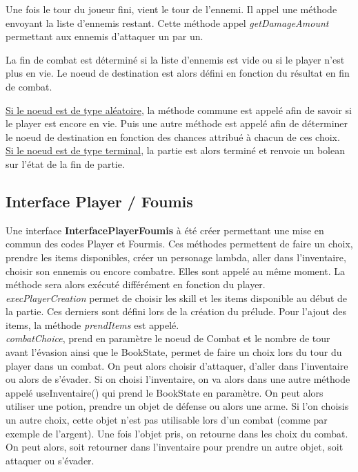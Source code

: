 		Une fois le tour du joueur fini, vient le tour de l'ennemi. Il appel une méthode envoyant la liste d'ennemis restant. Cette méthode appel \textit{getDamageAmount} permettant aux ennemis d'attaquer un par un.

		La fin de combat est déterminé si la liste d'ennemis est vide ou si le player n'est plus en vie. Le noeud de destination est alors défini en fonction du résultat en fin de combat.

		\underline{Si le noeud est de type aléatoire}, la méthode commune est appelé afin de savoir si le player est encore en vie. Puis une autre méthode est appelé afin de déterminer le noeud de destination en fonction des chances attribué à chacun de ces choix.\\

		\underline{Si le noeud est de type terminal}, la partie est alors terminé et renvoie un bolean sur l'état de la fin de partie.\\

	\subsection{Interface Player / Foumis}
		Une interface \textbf{InterfacePlayerFoumis} à été créer permettant une mise en commun des codes Player et Fourmis. Ces méthodes permettent de faire un choix, prendre les items disponibles, créer un personage lambda, aller dans l'inventaire, choisir son ennemis ou encore combatre. Elles sont appelé au même moment. La méthode sera alors exécuté différément en fonction du player.\\

		\textit{execPlayerCreation} permet de choisir les skill et les items disponible au début de la partie. Ces derniers sont défini lors de la création du prélude. Pour l'ajout des items, la méthode \textit{prendItems} est appelé.\\

		\textit{combatChoice}, prend en paramètre le noeud de Combat et le nombre de tour avant l'évasion ainsi que le BookState, permet de faire un choix lors du tour du player dans un combat. On peut alors choisir d'attaquer, d'aller dans l'inventaire ou alors de s'évader. Si on choisi l'inventaire, on va alors dans une autre méthode appelé useInventaire() qui prend le BookState en paramètre. On peut alors utiliser une potion, prendre un objet de défense ou alors une arme. Si l'on choisis un autre choix, cette objet n'est pas utilisable lors d'un combat (comme par exemple de l'argent). Une fois l'objet pris, on retourne dans les choix du combat. On peut alors, soit retourner dans l'inventaire pour prendre un autre objet, soit attaquer ou s'évader.\\

